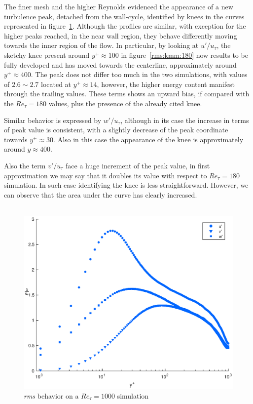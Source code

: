 The finer mesh and the higher Reynolds evidenced the appearance of a new turbulence peak, detached from the wall-cycle, identified by knees in the curves represented in figure~\ref{rms:1000}. Although the profiles are similar, with exception for the higher peaks reached, in the near wall region, they behave differently moving towards the inner region of the flow. In particular, by looking at $u'/u_{\tau}$, the sketchy knee present around $y^{+}\approx 100$ in figure~\ref{rms:kmm:180} now results to be fully developed and has moved towards the centerline, approximately around $y^{+}\approx 400$. The peak does not differ too much in the two simulations, with values of $2.6\sim2.7$ located at $y^{+}\approx14$, however, the higher energy content manifest through the trailing values. These terms shows an upward bias, if compared with the $Re_{\tau}=180$ values, plus the presence of the already cited knee.\par
Similar behavior is expressed by $w'/u_{\tau}$, although in its case the increase in terms of peak value is consistent, with a slightly decrease of the peak coordinate towards $y^{+}\approx30$. Also in this case the appearance of the knee is approximately around $y\approx 400$.\par
Also the term $v'/u_{\tau}$ face a huge increment of the peak value, in first approximation we may say that it doubles its value with respect to $Re_{\tau}=180$ simulation. In such case identifying the knee is less straightforward. However, we can observe that the area under the curve has clearly increased.\\~\par

\begin{figure}
\begin{center}
\includegraphics[scale=0.55]{grafici/rms_1000.eps}
\caption{\emph{rms} behavior on a $Re_{\tau}=1000$ simulation}
\label{rms:1000}
\end{center} 
\end{figure}

